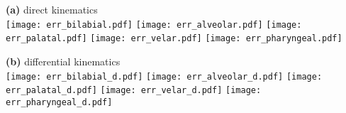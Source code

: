 \documentclass[varwidth=7.5in]{standalone}
\begin{document}
\raggedright

{\bf (a)} direct kinematics\\
\texttt{[image: err\_bilabial.pdf]}%
\texttt{[image: err\_alveolar.pdf]}%
\texttt{[image: err\_palatal.pdf]}%
\texttt{[image: err\_velar.pdf]}%
\texttt{[image: err\_pharyngeal.pdf]}

{\bf (b)} differential kinematics\\
\texttt{[image: err\_bilabial\_d.pdf]}%
\texttt{[image: err\_alveolar\_d.pdf]}%
\texttt{[image: err\_palatal\_d.pdf]}%
\texttt{[image: err\_velar\_d.pdf]}%
\texttt{[image: err\_pharyngeal\_d.pdf]}
\end{document}
